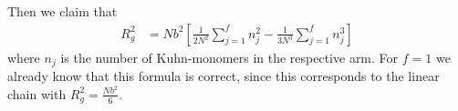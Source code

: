 \documentclass[english, parskip=full]{scrartcl}
\newcommand{\kla}{}
\newcommand{\klam}{}
\newcommand{\tecxt}{}
\renewcommand{\i}{\text{i}}
\newcommand{\e}{\text{e}}
\begin{document}
%
%
%
Then we claim that
\begin{align}
R_g^2 &= Nb^2 \klam\left[ \frac{1}{2N^2} \sum_{j=1}^f n_j^2 - \frac{1}{3N^3} \sum_{j=1}^f n_j^3 \right]
\end{align}
where $n_j$ is the number of Kuhn-monomers in the respective arm.
For $f=1$ we already know that this formula is correct, since this corresponds to the linear chain with $R_g^2 = \frac{Nb^2}{6}$.
\end{document}
